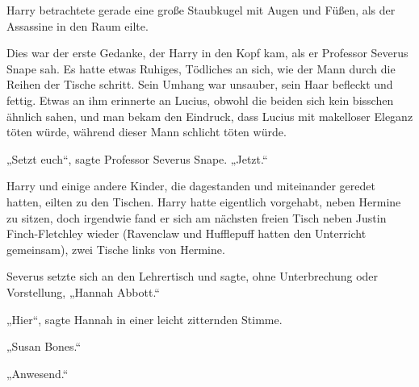 Harry betrachtete gerade eine große Staubkugel mit Augen und Füßen, als der Assassine in den Raum eilte.

Dies war der erste Gedanke, der Harry in den Kopf kam, als er Professor Severus Snape sah. Es hatte etwas Ruhiges, Tödliches an sich, wie der Mann durch die Reihen der Tische schritt. Sein Umhang war unsauber, sein Haar befleckt und fettig. Etwas an ihm erinnerte an Lucius, obwohl die beiden sich kein bisschen ähnlich sahen, und man bekam den Eindruck, dass Lucius mit makelloser Eleganz töten würde, während dieser Mann schlicht töten würde.

„Setzt euch“, sagte Professor Severus Snape. „Jetzt.“

Harry und einige andere Kinder, die dagestanden und miteinander geredet hatten, eilten zu den Tischen. Harry hatte eigentlich vorgehabt, neben Hermine zu sitzen, doch irgendwie fand er sich am nächsten freien Tisch neben Justin Finch-Fletchley wieder (Ravenclaw und Hufflepuff hatten den Unterricht gemeinsam), zwei Tische links von Hermine.

Severus setzte sich an den Lehrertisch und sagte, ohne Unterbrechung oder Vorstellung, „Hannah Abbott.“

„Hier“, sagte Hannah in einer leicht zitternden Stimme.

„Susan Bones.“

„Anwesend.“

